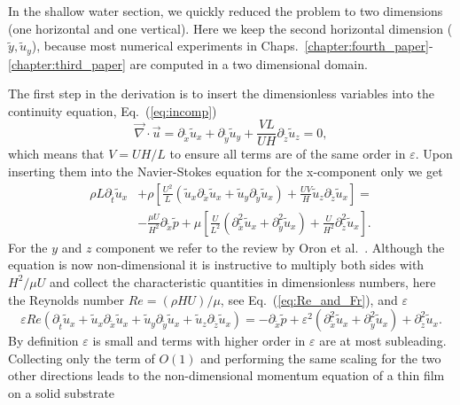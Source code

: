 In the shallow water section, we quickly reduced the problem to two dimensions (one horizontal and one vertical).
Here we keep the second horizontal dimension ($\tilde{y}, \tilde{u}_y$), because most numerical experiments in Chaps.~\ref{chapter:fourth_paper}-\ref{chapter:third_paper} are computed in a two dimensional domain. 
 
The first step in the derivation is to insert the dimensionless variables into the continuity equation, Eq.~(\ref{eq:incomp})
\begin{equation}\label{eq:cont_thin_film_1}
     \vec{\nabla}\cdot\vec{u} = \partial_{\tilde{x}} \tilde{u}_x + \partial_{\tilde{y}} \tilde{u}_y + \frac{V L}{U H}\partial_{\tilde{z}} \tilde{u}_z = 0,
\end{equation}
which means that $V = U H/L$ to ensure all terms are of the same order in $\varepsilon$.
Upon inserting them into the Navier-Stokes equation for the x-component only we get
\begin{align}
     \rho L \partial_{\tilde{t}}\tilde{u}_x &+ \rho\left[\frac{U^2}{L}\left(\tilde{u}_x\partial_{\tilde{x}}\tilde{u}_x + \tilde{u}_y\partial_{\tilde{y}}\tilde{u}_x\right) + \frac{U V}{H}\tilde{u}_z\partial_{\tilde{z}}\tilde{u}_x\right] = \nonumber \\ &-\frac{\mu U}{H^2} \partial_{\tilde{x}} \tilde{p} + \mu\left[\frac{U}{L^2}(\partial^2_{\tilde{x}}\tilde{u}_x + \partial^2_{\tilde{y}}\tilde{u}_x) + \frac{U}{H^2}\partial^2_{\tilde{z}}\tilde{u}_x\right].
\end{align}
For the $y$ and $z$ component we refer to the review by Oron et al.~\cite{oronLongscaleEvolutionThin1997}.
Although the equation is now non-dimensional it is instructive to multiply both sides with $H^2/\mu U$ and collect the characteristic quantities in dimensionless numbers, here the Reynolds number $Re = (\rho H U)/\mu$, see Eq.~(\ref{eq:Re_and_Fr}), and $\varepsilon$  
\begin{equation}
    \varepsilon Re \left(\partial_{\tilde{t}}\tilde{u}_x + \tilde{u}_x\partial_{\tilde{x}}\tilde{u}_x + \tilde{u}_y\partial_{\tilde{y}}\tilde{u}_x + \tilde{u}_z\partial_{\tilde{z}}\tilde{u}_x \right) = -\partial_{\tilde{x}}\tilde{p} + \varepsilon^2\left(\partial^2_{\tilde{x}}\tilde{u}_x + \partial^2_{\tilde{y}}\tilde{u}_x\right) + \partial^2_{\tilde{z}}\tilde{u}_x. 
\end{equation}
By definition $\varepsilon$ is small and terms with higher order in $\varepsilon$ are at most subleading.
Collecting only the term of $O(1)$ and performing the same scaling for the two other directions leads to the non-dimensional momentum equation of a thin film on a solid substrate
